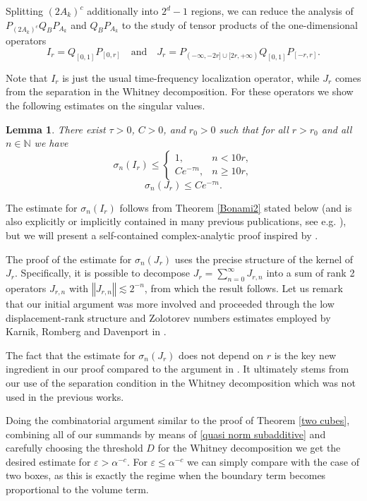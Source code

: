 \documentclass[12pt]{amsart}
\numberwithin{equation}{section}
\newcommand{\N}{\mathbb{N}}
\newcommand{\eps}{\varepsilon}
\newcommand{\norm}[1]{\left\Vert #1 \right\Vert}
\newtheorem{lemma}[Thm]{Lemma}
\begin{document}
Splitting $(2A_k)^c$ additionally into $2^d-1$ regions, we can reduce the analysis of $P_{(2A_k)^c} Q_B P_{A_k}$ and $Q_B P_{A_k}$  to the study of tensor products of the one-dimensional operators 
$$I_r=Q_{[0,1]}P_{[0,r]}\quad \text{and}\quad J_r=P_{(-\infty, -2r]\cup[2r, +\infty)}Q_{[0,1]}P_{[-r,r]}.$$

Note that $I_r$ is just the usual time-frequency localization operator, while $J_r$ comes from the separation in the Whitney decomposition. For these operators we show the following estimates on the singular values.
\begin{lemma}\label{One dimensional operators}
There exist $\tau > 0$, $C > 0$, and $r_0 > 0$ such that for all $r > r_0$ and all $n\in\N$ we have
$$\sigma_n(I_r) \le\begin{cases}1,&  n < 10r,\\
Ce^{-\tau n}, & n \ge 10r,
\end{cases}$$
$$\sigma_n(J_r) \le Ce^{-\tau n}.$$
\end{lemma}
The estimate for $\sigma_n(I_r)$ follows from Theorem \ref{Bonami2} stated below (and is also explicitly or implicitly contained in many previous publications, see e.g. \cite{Osipov,Bonami_kk}), but we will present a self-contained complex-analytic proof inspired by \cite{kulikov_2026}.

The proof of the estimate for $\sigma_n(J_r)$ uses the precise structure of the kernel of $J_r$. Specifically, it is possible to decompose $J_r = \sum_{n=0}^\infty J_{r,n}$ into a sum of rank 2 operators $J_{r,n}$ with $\norm{J_{r,n}} \lesssim 2^{-n}$, from which the result follows. Let us remark that our initial argument was more involved and proceeded through the low displacement-rank structure and Zolotorev numbers estimates employed by Karnik, Romberg and Davenport in \cite{Karnik_Romberg_Davenport}.

The fact that the estimate for $\sigma_n(J_r)$ does not depend on $r$ is the key new ingredient in our proof compared to the argument in \cite{Israel2}. It ultimately stems from our use of the separation condition in the Whitney decomposition which was not used in the previous works.

Doing the combinatorial argument similar to the proof of Theorem \ref{two cubes}, combining all of our summands by means of \eqref{quasi norm subadditive} and carefully choosing the threshold $D$ for the Whitney decomposition we get the desired estimate for $\eps > \alpha^{-c}$. For $\eps \le \alpha^{-c}$ we can simply compare with the case of two boxes, as this is exactly the regime when the boundary term becomes proportional to the volume term.
\end{document}

